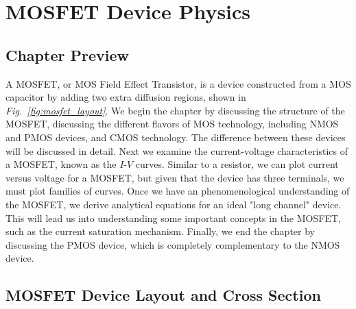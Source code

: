 \chapter{MOSFET Device Physics}
\label{ch:ch08_mos}
\graphicspath{{./figs_mos/}}
\section{Chapter Preview}
A MOSFET, or MOS Field Effect Transistor, is a device constructed from a MOS capacitor by adding two extra diffusion regions, shown in \emph{Fig.~\ref{fig:mosfet_layout}}.  We begin the chapter by discussing the structure of the MOSFET, discussing the different flavors of MOS technology, including NMOS and PMOS devices, and CMOS technology.  The difference between these devices will be discussed in detail.  Next we examine the current-voltage characteristics of a MOSFET, known as the $I$-$V$ curves.  Similar to a resistor, we can plot current versus voltage for a MOSFET, but given that the device has three terminals, we must plot families of curves.  Once we have an phenomenological understanding of the MOSFET, we derive analytical equations for an ideal "long channel" device.  This will lead us into understanding some important concepts in the MOSFET, such as the current saturation mechanism.  Finally, we end the chapter by discussing the PMOS device, which is completely complementary to the NMOS device.
\section{MOSFET Device Layout and Cross Section}
